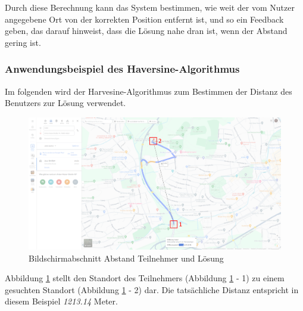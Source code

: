 Durch diese Berechnung kann das System bestimmen, wie weit der vom Nutzer angegebene Ort von der korrekten Position entfernt ist, und so ein Feedback geben, das darauf hinweist, dass die Lösung nahe dran ist, wenn der Abstand gering ist.

\subsubsection{Anwendungsbeispiel des Haversine-Algorithmus}

Im folgenden wird der Harvesine-Algorithmus zum Bestimmen der Distanz des Benutzers zur Lösung verwendet.

\begin{figure}[H]
    \centering
    \includegraphics[width=\textwidth]{images/PrAr_Impl_Geolocation-Map.png}
    \caption{Bildschirmabschnitt Abstand Teilnehmer und Lösung}
    \label{fig:implementierung:geolocation_map}
\end{figure}

Abbildung \ref{fig:implementierung:geolocation_map} stellt den Standort des Teilnehmers (Abbildung \ref{fig:implementierung:geolocation_map} - 1) zu einem gesuchten Standort (Abbildung \ref{fig:implementierung:geolocation_map} - 2) dar. Die tatsächliche Distanz entspricht in diesem Beispiel \textit{1213.14} Meter.

